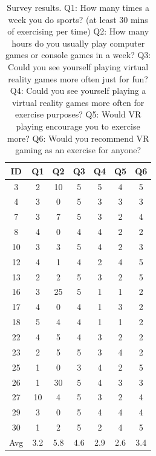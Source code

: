 \documentclass{sig-alternate-05-2015}
\begin{document}
\begin{table}
    \centering
    \caption
    {
        Survey results.\newline
        Q1: How many times a week you do sports? (at least 30 mins of exercising per time)\newline
        Q2: How many hours do you usually play computer games or console games in a week?\newline
        Q3: Could you see yourself playing virtual reality games more often just for fun?\newline
        Q4: Could you see yourself playing a virtual reality games more often for exercise purposes?\newline
        Q5: Would VR playing encourage you to exercise more?\newline
        Q6: Would you recommend VR gaming as an exercise for anyone?\newline
    }
    \begin{tabular}{c|c c c c c c} \hline
        ID&Q1&Q2&Q3&Q4&Q5&Q6 \\ \hline
        3&2&10&5&5&4&5\\
        4&3&0&5&3&3&3\\
        7&3&7&5&3&2&4\\
        8&4&0&4&4&2&2\\
        10&3&3&5&4&2&3\\
        12&4&1&4&2&4&5\\
        13&2&2&5&3&2&5\\
        16&3&25&5&1&1&2\\
        17&4&0&4&1&3&2\\
        18&5&4&4&1&1&2\\
        22&4&5&4&3&2&2\\
        23&2&5&5&3&4&2\\
        25&1&0&3&4&2&5\\
        26&1&30&5&4&3&3\\
        27&10&4&5&3&2&4\\
        29&3&0&5&4&4&4\\
        30&1&2&5&2&4&5\\ \hline
        Avg&3.2&5.8&4.6&2.9&2.6&3.4
    \end{tabular}
\end{table}
\end{document}
